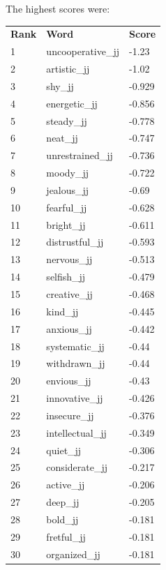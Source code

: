 \documentclass[10pt,letterpaper]{book}
\begin{document}
The highest scores were:
\begin{tabular}{ l l l }
        \textbf{Rank} & \textbf{Word} & \textbf{Score} \\
        1 & uncooperative\_jj & -1.23 \\
        2 & artistic\_jj & -1.02 \\
        3 & shy\_jj & -0.929 \\
        4 & energetic\_jj & -0.856 \\
        5 & steady\_jj & -0.778 \\
        6 & neat\_jj & -0.747 \\
        7 & unrestrained\_jj & -0.736 \\
        8 & moody\_jj & -0.722 \\
        9 & jealous\_jj & -0.69 \\
        10 & fearful\_jj & -0.628 \\
        11 & bright\_jj & -0.611 \\
        12 & distrustful\_jj & -0.593 \\
        13 & nervous\_jj & -0.513 \\
        14 & selfish\_jj & -0.479 \\
        15 & creative\_jj & -0.468 \\
        16 & kind\_jj & -0.445 \\
        17 & anxious\_jj & -0.442 \\
        18 & systematic\_jj & -0.44 \\
        19 & withdrawn\_jj & -0.44 \\
        20 & envious\_jj & -0.43 \\
        21 & innovative\_jj & -0.426 \\
        22 & insecure\_jj & -0.376 \\
        23 & intellectual\_jj & -0.349 \\
        24 & quiet\_jj & -0.306 \\
        25 & considerate\_jj & -0.217 \\
        26 & active\_jj & -0.206 \\
        27 & deep\_jj & -0.205 \\
        28 & bold\_jj & -0.181 \\
        29 & fretful\_jj & -0.181 \\
        30 & organized\_jj & -0.181 \\
\end{tabular}
\end{document}
